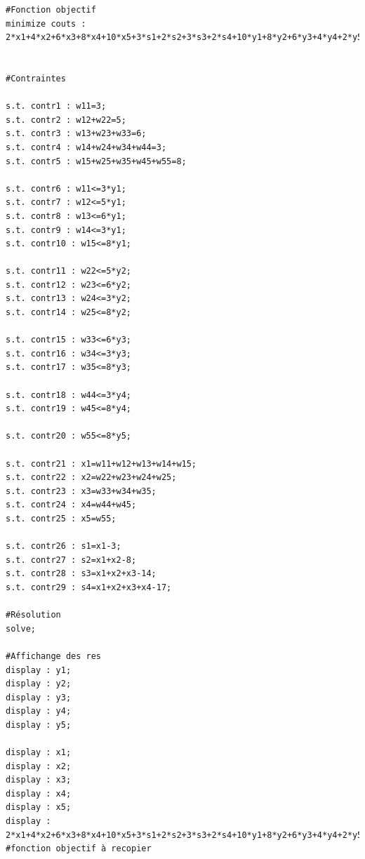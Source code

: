 \documentclass[a4paper,11pt,twoside]{report}
\begin{document}
\begin{appendices}
\begin{verbatim}
#Fonction objectif
minimize couts : 2*x1+4*x2+6*x3+8*x4+10*x5+3*s1+2*s2+3*s3+2*s4+10*y1+8*y2+6*y3+4*y4+2*y5;


#Contraintes

s.t. contr1 : w11=3;
s.t. contr2 : w12+w22=5;
s.t. contr3 : w13+w23+w33=6;
s.t. contr4 : w14+w24+w34+w44=3;
s.t. contr5 : w15+w25+w35+w45+w55=8;

s.t. contr6 : w11<=3*y1;
s.t. contr7 : w12<=5*y1;
s.t. contr8 : w13<=6*y1;
s.t. contr9 : w14<=3*y1;
s.t. contr10 : w15<=8*y1;

s.t. contr11 : w22<=5*y2;
s.t. contr12 : w23<=6*y2;
s.t. contr13 : w24<=3*y2;
s.t. contr14 : w25<=8*y2;

s.t. contr15 : w33<=6*y3;
s.t. contr16 : w34<=3*y3;
s.t. contr17 : w35<=8*y3;

s.t. contr18 : w44<=3*y4;
s.t. contr19 : w45<=8*y4;

s.t. contr20 : w55<=8*y5;

s.t. contr21 : x1=w11+w12+w13+w14+w15;
s.t. contr22 : x2=w22+w23+w24+w25;
s.t. contr23 : x3=w33+w34+w35;
s.t. contr24 : x4=w44+w45;
s.t. contr25 : x5=w55;

s.t. contr26 : s1=x1-3;
s.t. contr27 : s2=x1+x2-8;
s.t. contr28 : s3=x1+x2+x3-14;
s.t. contr29 : s4=x1+x2+x3+x4-17;

#Résolution
solve;

#Affichange des res
display : y1;
display : y2;
display : y3;
display : y4;
display : y5;

display : x1;
display : x2;
display : x3;
display : x4;
display : x5;
display : 2*x1+4*x2+6*x3+8*x4+10*x5+3*s1+2*s2+3*s3+2*s4+10*y1+8*y2+6*y3+4*y4+2*y5; #fonction objectif à recopier
\end{verbatim}

\end{appendices}
\end{document}
